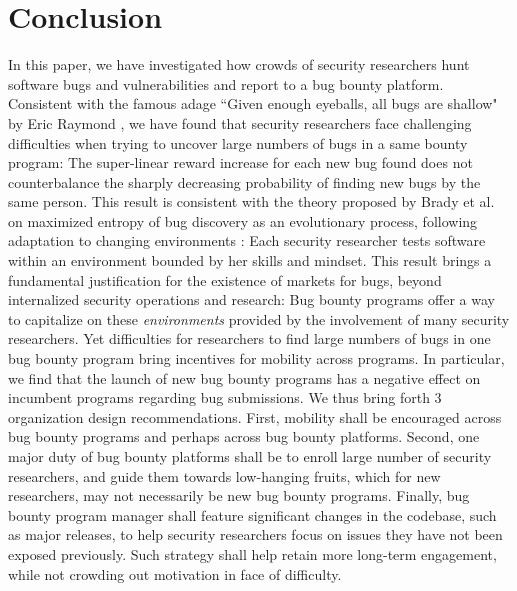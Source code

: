 \section{Conclusion}
\label{sec:conclusion}
In this paper, we have investigated how crowds of security researchers hunt software bugs and vulnerabilities and report to a bug bounty platform. Consistent with the famous adage ``Given enough eyeballs, all bugs are shallow" by Eric Raymond \cite{raymond1999cathedral}, we have found that security researchers face challenging difficulties when trying to uncover large numbers of bugs in a same bounty program: The super-linear reward increase for each new bug found does not counterbalance the sharply decreasing probability of finding new bugs by the same person. This result is consistent with the theory proposed by Brady et al. on maximized entropy of bug discovery as an evolutionary process, following adaptation to changing environments \cite{brady1999murphy}: Each security researcher tests software within an environment bounded by her skills and mindset. This result brings a fundamental justification for the existence of markets for bugs, beyond internalized security operations and research: Bug bounty programs offer a way to capitalize on these {\it environments} provided by the involvement of many security researchers. Yet difficulties for researchers to find large numbers of bugs in one bug bounty program bring incentives for mobility across programs. In particular, we find that the launch of new bug bounty programs has a negative effect on incumbent programs regarding bug submissions. We thus bring forth 3 organization design recommendations. First, mobility shall be encouraged across bug bounty programs and perhaps across bug bounty platforms. Second, one major duty of bug bounty platforms shall be to enroll large number of security researchers, and guide them towards low-hanging fruits, which for new researchers, may not necessarily be new bug bounty programs. Finally, bug bounty program manager shall feature significant changes in the codebase, such as major releases, to help security researchers focus on issues they have not been exposed previously. Such strategy shall help retain more long-term engagement, while not crowding out motivation in face of difficulty. 
